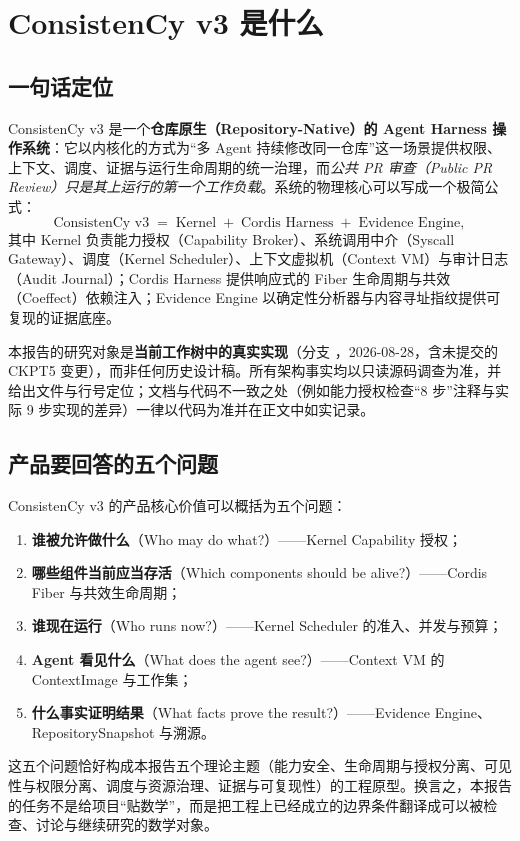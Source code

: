 \chapter{ConsistenCy v3 是什么}\label{ch:intro}

\section{一句话定位}

ConsistenCy v3 是一个\textbf{仓库原生（Repository-Native）的 Agent Harness 操作系统}：它以内核化的方式为“多 Agent 持续修改同一仓库”这一场景提供权限、上下文、调度、证据与运行生命周期的统一治理，而\emph{公共 PR 审查（Public PR Review）只是其上运行的第一个工作负载}。系统的物理核心可以写成一个极简公式：
\begin{equation}
\text{ConsistenCy v3} \;=\; \text{Kernel} \;+\; \text{Cordis Harness} \;+\; \text{Evidence Engine},
\end{equation}
其中 Kernel 负责能力授权（Capability Broker）、系统调用中介（Syscall Gateway）、调度（Kernel Scheduler）、上下文虚拟机（Context VM）与审计日志（Audit Journal）；Cordis Harness 提供响应式的 Fiber 生命周期与共效（Coeffect）依赖注入；Evidence Engine 以确定性分析器与内容寻址指纹提供可复现的证据底座。

本报告的研究对象是\textbf{当前工作树中的真实实现}（分支 ，2026-08-28，含未提交的 CKPT5 变更），而非任何历史设计稿。所有架构事实均以只读源码调查为准，并给出文件与行号定位；文档与代码不一致之处（例如能力授权检查“8 步”注释与实际 9 步实现的差异）一律以代码为准并在正文中如实记录。

\section{产品要回答的五个问题}

ConsistenCy v3 的产品核心价值可以概括为五个问题：
\begin{enumerate}[itemsep=0.1em]
  \item \textbf{谁被允许做什么}（Who may do what?）——Kernel Capability 授权；
  \item \textbf{哪些组件当前应当存活}（Which components should be alive?）——Cordis Fiber 与共效生命周期；
  \item \textbf{谁现在运行}（Who runs now?）——Kernel Scheduler 的准入、并发与预算；
  \item \textbf{Agent 看见什么}（What does the agent see?）——Context VM 的 ContextImage 与工作集；
  \item \textbf{什么事实证明结果}（What facts prove the result?）——Evidence Engine、RepositorySnapshot 与溯源。
\end{enumerate}
这五个问题恰好构成本报告五个理论主题（能力安全、生命周期与授权分离、可见性与权限分离、调度与资源治理、证据与可复现性）的工程原型。换言之，本报告的任务不是给项目“贴数学”，而是把工程上已经成立的边界条件翻译成可以被检查、讨论与继续研究的数学对象。

